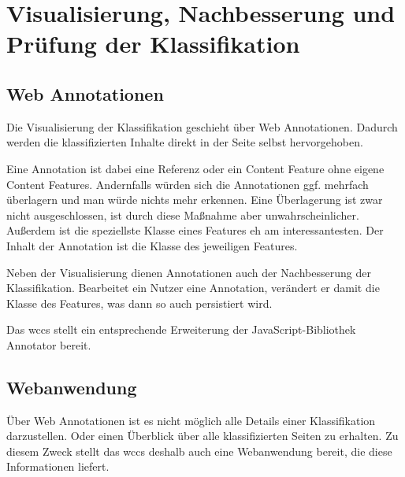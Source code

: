 \section{Visualisierung, Nachbesserung und Prüfung der Klassifikation}
    \label{section:conceptVisualization}

    \subsection{Web Annotationen}
        Die Visualisierung der Klassifikation geschieht über Web Annotationen.
        Dadurch werden die klassifizierten Inhalte direkt in der Seite selbst hervorgehoben.

        Eine Annotation ist dabei eine Referenz oder ein Content Feature ohne eigene Content Features.
        Andernfalls würden sich die Annotationen ggf. mehrfach überlagern und man würde nichts mehr erkennen.
        Eine Überlagerung ist zwar nicht ausgeschlossen, ist durch diese Maßnahme aber unwahrscheinlicher.
        Außerdem ist die speziellste Klasse eines Features eh am interessantesten.
        Der Inhalt der Annotation ist die Klasse des jeweiligen Features.

        Neben der Visualisierung dienen Annotationen auch der Nachbesserung der Klassifikation.
        Bearbeitet ein Nutzer eine Annotation, verändert er damit die Klasse des Features,
        was dann so auch persistiert wird.

        Das \gls{wccs} stellt ein entsprechende Erweiterung der JavaScript-Bibliothek Annotator bereit.

    
    \subsection{Webanwendung}
        Über Web Annotationen ist es nicht möglich alle Details einer Klassifikation darzustellen.
        Oder einen Überblick über alle klassifizierten Seiten zu erhalten.
        Zu diesem Zweck stellt das \gls{wccs} deshalb auch eine Webanwendung bereit,
        die diese Informationen liefert.


